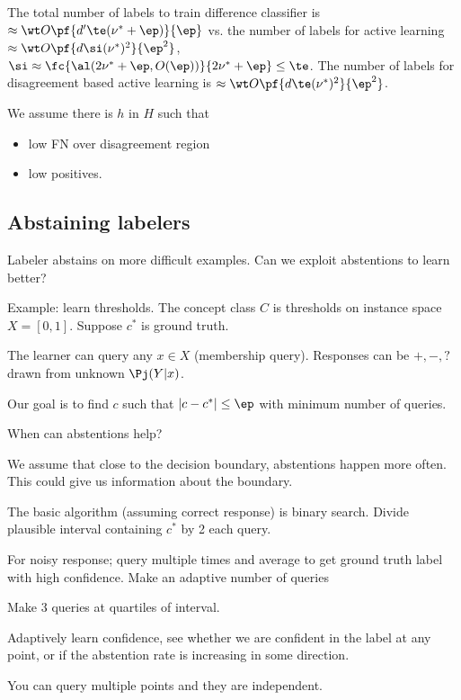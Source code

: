 The total number of labels to train difference classifier is $\approx \wt O\pf{d'\te(\nu^*+\ep)}{\ep}$ vs. the number of labels for active learning $\approx \wt O\pf{d\si(\nu^*)^2}{\ep^2}$, $\si\approx \fc{\al (2\nu^*+\ep, O(\ep))}{2\nu^*+\ep}\le \te$. The number of labels for disagreement based active learning is  $\approx \wt O\pf{d\te(\nu^*)^2}{\ep^2}$.

We assume there is $h$ in $H$ such that
\begin{itemize}
\item
low FN over disagreement region
\item
low positives.
\end{itemize}

\subsection{Abstaining labelers}

Labeler abstains on more difficult examples. Can we exploit abstentions to learn better?

Example: learn thresholds. The concept class $C$ is thresholds on instance space $X=[0,1]$. Suppose $c^*$ is ground truth.

The learner can query any $x\in X$ (membership query).  Responses can be $+,-,?$ drawn from unknown $\Pj(Y|x)$.

Our goal is to find $c$ such that $|c-c^*|\le \ep$ with minimum number of queries.

When can abstentions help?

We assume that close to the decision boundary, abstentions happen more often.  This could give us information about the boundary.


The basic algorithm (assuming correct response) is binary search. Divide plausible interval containing $c^*$ by 2 each query.

For noisy response; query multiple times and average to get ground truth label with high confidence.
Make an adaptive number of queries

Make 3 queries at quartiles of interval.

Adaptively learn confidence, see whether we are confident in the label at any point, or if the abstention rate is increasing in some direction.

You can query multiple points and they are independent.

